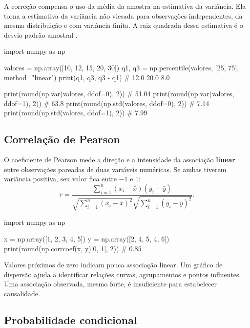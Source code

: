 A correção compensa o uso da média da amostra na estimativa da variância. Ela torna a estimativa da variância não viesada para observações independentes, da mesma distribuição e com variância finita. A raiz quadrada dessa estimativa é o desvio padrão amostral \cite{numpy}.

\begin{exemplo}
import numpy as np

valores = np.array([10, 12, 15, 20, 30])
q1, q3 = np.percentile(valores, [25, 75], method="linear")
print(q1, q3, q3 - q1)  # 12.0 20.0 8.0

print(round(np.var(valores, ddof=0), 2))  # 51.04
print(round(np.var(valores, ddof=1), 2))  # 63.8
print(round(np.std(valores, ddof=0), 2))  # 7.14
print(round(np.std(valores, ddof=1), 2))  # 7.99
\end{exemplo}


\subsection{Correlação de Pearson}

O coeficiente de Pearson mede a direção e a intensidade da associação \textbf{linear} entre observações pareadas de duas variáveis numéricas. Se ambas tiverem variância positiva, seu valor fica entre \(-1\) e \(1\):
\[
r=
\frac{\sum_{i=1}^{n}(x_i-\bar{x})(y_i-\bar{y})}
{\sqrt{\sum_{i=1}^{n}(x_i-\bar{x})^2}\sqrt{\sum_{i=1}^{n}(y_i-\bar{y})^2}}.
\]

\begin{exemplo}
import numpy as np

x = np.array([1, 2, 3, 4, 5])
y = np.array([2, 4, 5, 4, 6])
print(round(np.corrcoef(x, y)[0, 1], 2))  # 0.85
\end{exemplo}

Valores próximos de zero indicam pouca associação linear. Um gráfico de dispersão ajuda a identificar relações curvas, agrupamentos e pontos influentes. Uma associação observada, mesmo forte, é insuficiente para estabelecer causalidade.

\subsection{Probabilidade condicional}

